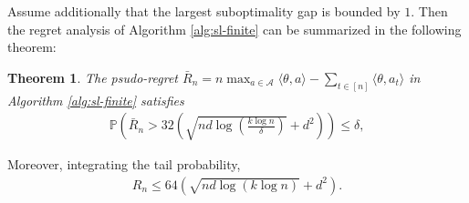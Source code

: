 \documentclass[10pt,a4article]{amsart}
\numberwithin{equation}{section}
\theoremstyle{plain}
\newtheorem{Th}{Theorem}
\theoremstyle{definition}
\def\P{{\mathbb P}}
\def\t{{\theta}}
\begin{document}
Assume additionally that the largest suboptimality gap is bounded by $1$. Then the regret analysis of Algorithm \ref{alg:sl-finite} can be summarized in the following theorem:

\begin{Th}\label{sl:finite}
The psudo-regret $\bar{R}_n=n\max_{a\in\mathcal A}\langle\t, a\rangle-\sum_{t\in [n]}\langle\t, a_t\rangle$ in Algorithm \ref{alg:sl-finite} satisfies
\begin{align*}
\P\left(\bar{R}_n> 32\left(\sqrt{nd\log\left(\frac{k\log n}{\delta}\right)}+d^2\right)\right)\leq \delta, 
\end{align*}
\end{Th}
Moreover, integrating the tail probability,
\begin{align*}
R_n\leq 64(\sqrt{nd\log (k\log n)}+d^2). 
\end{align*}
\end{document}

